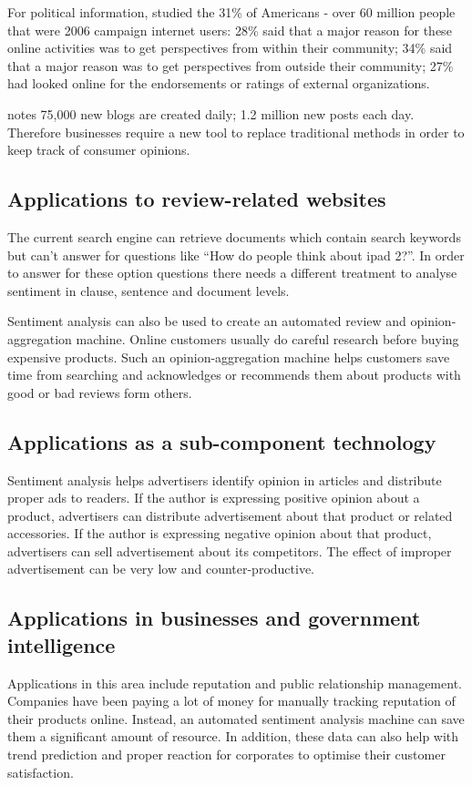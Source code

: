 \documentclass{article}
\begin{document}
\begin{multicols}{2}
    For political information, \citet{Rainie2007} studied 
the 31\% of Americans - over 60 million people that were 2006 campaign internet 
users: 28\% said that a major reason for these online activities was to
get perspectives from within their community; 34\% said that a major reason was 
to get perspectives from outside their community; 27\% had looked online for 
the endorsements or ratings of external organizations.
      
    \citet{ForrestWave2006} notes 75,000 new blogs are created daily; 1.2 million 
new posts each day. Therefore businesses require a new tool to replace traditional 
methods in order to keep track of consumer opinions.

    \subsection{Applications to review-related websites}
      The current search engine can retrieve documents which contain search
keywords but can't answer for questions like ``How do people think about 
ipad 2?''. In order to answer for these option questions there needs a different 
treatment to analyse sentiment in clause, sentence and document levels. 

      Sentiment analysis can also be used to create an automated review and 
opinion-aggregation machine. Online customers usually do careful research before 
buying expensive products. Such an opinion-aggregation machine helps customers
save time from searching and acknowledges or recommends them about products 
with good or bad reviews form others.

    \subsection{Applications as a sub-component technology}
        Sentiment analysis helps advertisers identify opinion in articles
and distribute proper ads to readers. If the author is expressing positive
opinion about a product, advertisers can distribute advertisement about that
product or related accessories. If the author is expressing negative opinion
about that product, advertisers can sell advertisement about its competitors.
The effect of improper advertisement can be very low and counter-productive.

    \subsection{Applications in businesses and government intelligence}
        Applications in this area include reputation and public 
relationship management. Companies have been paying a lot of money for manually 
tracking reputation of their products online. Instead, an automated sentiment 
analysis machine can save them a significant amount of resource. In addition, these data
can also help with trend prediction and proper reaction for corporates to
optimise their customer satisfaction.


\end{multicols}
\end{document}
